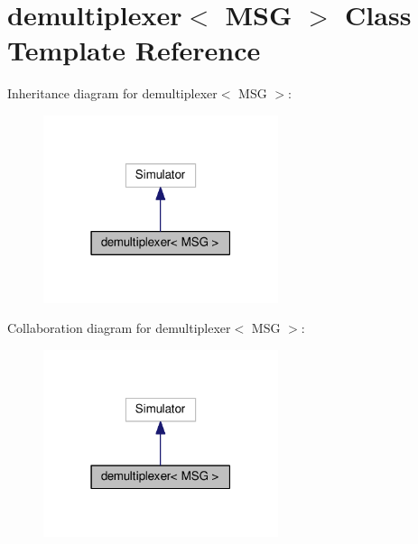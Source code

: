 \hypertarget{classdemultiplexer}{}\section{demultiplexer$<$ M\+SG $>$ Class Template Reference}
\label{classdemultiplexer}


Inheritance diagram for demultiplexer$<$ M\+SG $>$\+:\nopagebreak
\begin{figure}[H]
\begin{center}
\leavevmode
\includegraphics[width=195pt]{classdemultiplexer__inherit__graph}
\end{center}
\end{figure}


Collaboration diagram for demultiplexer$<$ M\+SG $>$\+:\nopagebreak
\begin{figure}[H]
\begin{center}
\leavevmode
\includegraphics[width=195pt]{classdemultiplexer__coll__graph}
\end{center}
\end{figure}
